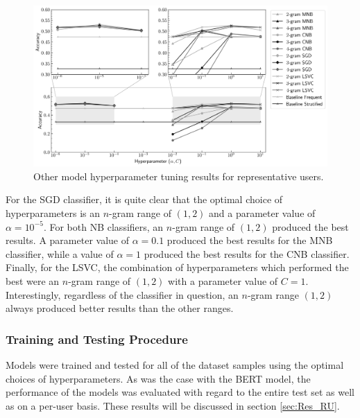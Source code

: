 \begin{figure}[ht]
    \hspace*{-0.3in}
    \includegraphics[scale=0.55]{figures/05_impl/02_pu/plot_hyperparams_base.png}
    \caption{Other model hyperparameter tuning results for representative users.}
    \label{fig:DI_PU_BaseHP}
\end{figure}

For the SGD classifier, it is quite clear that the optimal choice of hyperparameters is an $n$-gram range of $(1, 2)$ and a parameter value of $\alpha=10^{-5}$. For both NB classifiers, an $n$-gram range of $(1, 2)$ produced the best results. A parameter value of $\alpha=0.1$ produced the best results for the MNB classifier, while a value of $\alpha=1$ produced the best results for the CNB classifier. Finally, for the LSVC, the combination of hyperparameters which performed the best were an $n$-gram range of $(1, 2)$ with a parameter value of $C=1$. Interestingly, regardless of the classifier in question, an $n$-gram range $(1, 2)$ always produced better results than the other ranges.

\subsubsection{Training and Testing Procedure}

Models were trained and tested for all of the dataset samples using the optimal choices of hyperparameters. As was the case with the BERT model, the performance of the models was evaluated with regard to the entire test set as well as on a per-user basis. These results will be discussed in section \ref{sec:Res_RU}.
